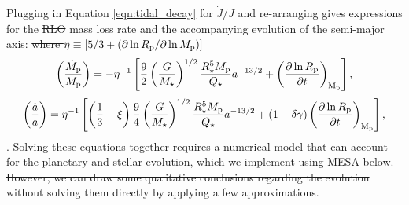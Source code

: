 \documentclass{svjour3}                     %
\providecommand{\DIFadd}[1]{{\protect\color{blue}\uwave{#1}}} %
\providecommand{\DIFdel}[1]{{\protect\color{red}\sout{#1}}}                      %
\providecommand{\DIFaddbegin}{} %
\providecommand{\DIFaddend}{} %
\providecommand{\DIFdelbegin}{} %
\providecommand{\DIFdelend}{} %
\begin{document}
Plugging in Equation \ref{eqn:tidal_decay} \DIFdelbegin \DIFdel{for $\dot{J}/J$ }\DIFdelend and re-arranging gives expressions for the \DIFdelbegin \DIFdel{RLO }\DIFdelend mass loss rate and the accompanying evolution of the semi-major axis:
\DIFdelbegin %
\DIFdel{where $\eta \equiv \left[ 5/3 + \left( \partial \ln R_{\rm p}/\partial \ln M_{\rm p} \right) \right]$}\DIFdelend \DIFaddbegin \begin{equation}
\left( \frac{\dot{M}_{\rm p}}{M_{\rm p}} \right) = -\eta^{-1} \left[ \frac{9}{2} \left( \frac{G}{M_{\star}} \right)^{1/2} \frac{R_{\star}^5 M_{\rm p}}{Q_{\star}} a^{-13/2} + \left( \frac{\partial \ln R_{\rm p}}{\partial t} \right)_{\rm M_{\rm p}} \right],
\label{eqn:RLO_mass_loss_rate}
\end{equation}
\begin{equation}
\left( \frac{\dot{a}}{a} \right) = \eta^{-1} \left[\left( \frac{1}{3} - \xi \right) \frac{9}{4} \left( \frac{G}{M_{\star}} \right)^{1/2} \frac{R_{\star}^5 M_{\rm p}}{Q_{\star}} a^{-13/2} + \left( 1 - \delta \gamma \right) \left( \frac{\partial \ln R_{\rm p}}{\partial t} \right)_{\rm M_{\rm p}} \right],
\label{eqn:a_evolution_rate}
\end{equation}
\DIFadd{where $\eta \equiv \xi/2 + 5/6 - \delta \gamma$}\DIFaddend . 
Solving these equations together requires a numerical model that can account for the planetary and stellar evolution, which we implement using MESA below. 
\DIFdelbegin \DIFdel{However, we can draw some qualitative conclusions regarding the evolution without solving them directly by applying a few approximations. }\DIFdelend 
\end{document}
